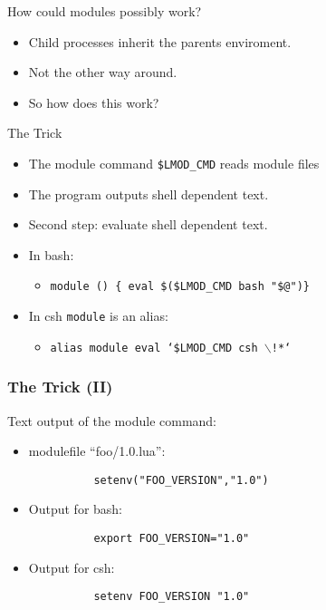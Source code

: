 \documentclass{beamer}
\begin{document}
\begin{frame}{How could modules possibly work?}
  \begin{itemize}
    \item Child processes inherit the parents enviroment.
    \item Not the other way around.
    \item So how does this work?
  \end{itemize}
\end{frame}

\begin{frame}{The Trick}
  \begin{itemize}
    \item The module command {\color{blue}\texttt{\$LMOD\_CMD}} reads module files
    \item The program outputs shell dependent text.
    \item Second step: evaluate shell dependent text.
    \item In bash:
      \begin{itemize}
          \item {\color{blue}\texttt{module () \{ eval \$(\$LMOD\_CMD bash "\$@")\}}}
      \end{itemize}
    \item In csh \texttt{module} is an alias:
      \begin{itemize}
        \item {\color{blue}\texttt{alias module eval `\$LMOD\_CMD csh $\backslash$!*`}}
      \end{itemize}
  \end{itemize}
\end{frame}

\begin{frame}[fragile]
    \frametitle{The Trick (II)}
    Text output of the module command:
    \begin{itemize}
      \item modulefile ``foo/1.0.lua'':
    {
\begin{verbatim}
          setenv("FOO_VERSION","1.0")
\end{verbatim}
    }
     \item Output for bash:
\begin{verbatim}
          export FOO_VERSION="1.0"
\end{verbatim}
     \item Output for csh:
\begin{verbatim}
          setenv FOO_VERSION "1.0"
\end{verbatim}
    \end{itemize}
\end{frame}
\end{document}
